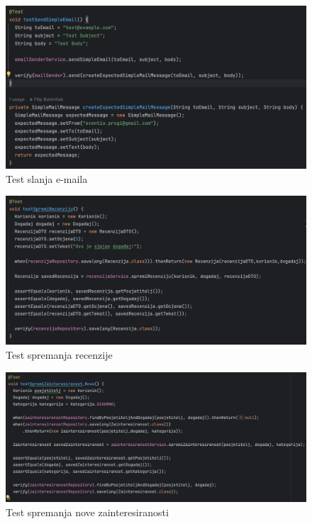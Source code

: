 			
			
			\begin{figure}[H]
				\includegraphics[scale=0.45]{testovi/emailTest.png}
				\centering
				\caption{Test slanja e-maila}
				\label{fig:promjene}
			\end{figure}
			
			\begin{figure}[H]
				\includegraphics[scale=0.45]{testovi/recenzijeTest.png}
				\centering
				\caption{Test spremanja recenzije}
				\label{fig:promjene}
			\end{figure}
			
			\begin{figure}[H]
				\includegraphics[scale=0.45]{testovi/zainteresiranostTest1.png}
				\centering
				\caption{Test spremanja nove zainteresiranosti}
				\label{fig:promjene}
			\end{figure}
			
